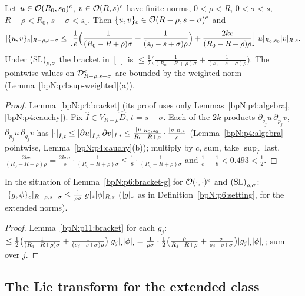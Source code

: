 \begin{lemma}\label{bpN:p11:bracket}
Let $u\in\mathcal O(R_0,s_0)^e$, $v\in\mathcal O(R,s)^e$ have finite norms, $0<\rho<R$, $0<\sigma<s$, $R-\rho<R_0$, $s-\sigma<s_0$. Then $\{u,v\}_c\in\mathcal O(R-\rho,s-\sigma)^e$ and
\[\lvert \{u,v\}_c\rvert_{R-\rho,s-\sigma}\le\Bigl[\frac1e\Bigl(\frac1{(R_0-R+\rho)\sigma}+\frac1{(s_0-s+\sigma)\rho}\Bigr)+\frac{2kc}{(R_0-R+\rho)\rho}\Bigr]\lvert u\rvert_{R_0,s_0}\lvert v\rvert_{R,s} .\]
Under $\textup{(SL)}_{\rho,\sigma}$ the bracket in $[\ ]$ is $\le\frac12\bigl(\frac1{(R_0-R+\rho)\sigma}+\frac1{(s_0-s+\sigma)\rho}\bigr)$. The pointwise values on $\mathcal D_{R-\rho,s-\sigma}^e$ are bounded by the weighted norm (Lemma~\ref{bpN:p4:sup-weighted}(a)).
\end{lemma}
\begin{proof}
\label{stepN:p11:br-fast} Lemma~\ref{bpN:p4:bracket} (its proof uses only Lemmas~\ref{bpN:p4:algebra}, \ref{bpN:p4:cauchy}).
\label{stepN:p11:br-slow} Fix $\hat I\in V_{R-\rho}\hat D$, $t=s-\sigma$. Each of the $2k$ products $\partial_{\tilde q_j}u\,\partial_{\tilde p_j}v$, $\partial_{\tilde p_j}u\,\partial_{\tilde q_j}v$ has $\lvert \cdot\rvert_{\hat I,t}\le\lvert \partial u\rvert_{\hat I,t}\lvert \partial v\rvert_{\hat I,t}\le\frac{\lvert u\rvert_{R_0,s_0}}{R_0-R+\rho}\cdot\frac{\lvert v\rvert_{R,s}}\rho$ (Lemma~\ref{bpN:p4:algebra} pointwise, Lemma~\ref{bpN:p4:cauchy}(b)); multiply by $c$, sum, take $\sup_{\hat I}$ last.
\label{stepN:p11:br-dom} $\frac{2kc}{(R_0-R+\rho)\rho}=\frac{2kc\sigma}\rho\cdot\frac1{(R_0-R+\rho)\sigma}\le\frac18\cdot\frac1{(R_0-R+\rho)\sigma}$ and $\frac1e+\frac18<0.493<\frac12$.
\end{proof}

\begin{lemma}\label{bpN:p11:bracket-g}
In the situation of Lemma~\ref{bpN:p6:bracket-g} for $\mathcal O(\cdot,\cdot)^e$ and $\textup{(SL)}_{\rho,\sigma}$: $\lvert \{g,\phi\}_c\rvert_{R-\rho,s-\sigma}\le\frac1{\rho\sigma}\lvert g\rvert_*\lvert \phi\rvert_{R,s}$ ($\lvert g\rvert_*$ as in Definition~\ref{bpN:p6:setting}, for the extended norms).
\end{lemma}
\begin{proof}
Lemma~\ref{bpN:p11:bracket} for each $g_j$: $\le\frac12\bigl(\frac1{(R_j-R+\rho)\sigma}+\frac1{(s_j-s+\sigma)\rho}\bigr)\lvert g_j\rvert_{,}\lvert \phi\rvert_{,}=\frac1{\rho\sigma}\cdot\frac12\bigl(\frac\rho{R_j-R+\rho}+\frac\sigma{s_j-s+\sigma}\bigr)\lvert g_j\rvert_{,}\lvert \phi\rvert_{,}$; sum over $j$.
\end{proof}

\subsection{The Lie transform for the extended class}\label{bpN:p11:s-lie}

